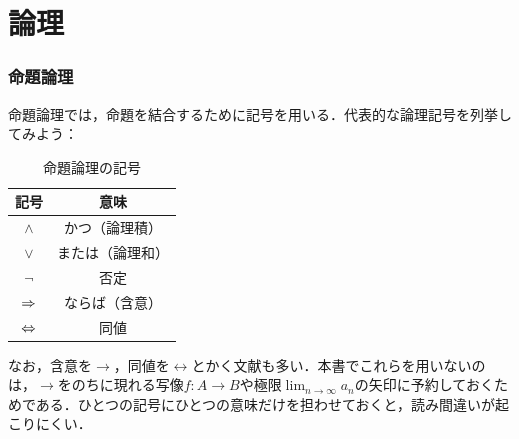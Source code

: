 \part{論理}

\begin{abstract}
この章では，数学の議論を支える「論理」を整理する．まず命題論理の記号と真理値表を確認し，交換律・分配律・ド・モルガンの法則などの基本法則を述べる．含意の真偽をめぐる注意と，逆・裏・対偶の関係もここで確認する．続いて，必要条件・十分条件という言い回しと，証明を支える推論規則を恒真式として整理し，同値を用いた証明で述べるべきことを確認する．次に，変数を含む文を扱う述語論理を導入し，全称命題・存在命題，自由変数と束縛変数，および量化子の入れ子について注意しよう．最後に，量化子の否定を用いて「数列が収束しないこと」を書き下す．
\end{abstract}

\section{命題論理}

命題論理では，命題を結合するために記号を用いる．代表的な論理記号を列挙してみよう：

\begin{table}[ht]
  \centering
  \caption{命題論理の記号}
  \begin{tabular}{c|c}
    \hline
    記号      & 意味                                     \\
    \hline
    $\land$   & かつ（論理積\index{ろんりせき@論理積}）   \\
    $\lor$    & または（論理和\index{ろんりわ@論理和}）  \\
    $\lnot$   & 否定\index{ひてい@否定}                  \\
    $\mathrel{\Rightarrow}$   & ならば（含意\index{がんい@含意}）        \\
    $\mathrel{\Leftrightarrow}$ & 同値\index{どうち@同値}                  \\
    \hline
  \end{tabular}
\end{table}

なお，含意を$\to$，同値を$\leftrightarrow$とかく文献も多い．本書でこれらを用いないのは，$\to$をのちに現れる写像$f \colon A \to B$や極限$\lim_{n \to \infty} a_n$の矢印に予約しておくためである．ひとつの記号にひとつの意味だけを担わせておくと，読み間違いが起こりにくい．

